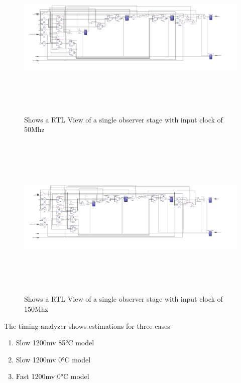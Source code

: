 \begin{figure}[]
\centering
\includegraphics[width=650px,height=300px,angle=-90]{../../pictures/22.02.2014/onlyObserver/OBS_50M.jpg}
\caption[RTL View of Observer 0 with clock 50Mhz]{Shows a RTL View of a single observer stage with input clock of 50Mhz}
\label{fig:test:only:50:obs0}
\end{figure}


\begin{figure}[]
\centering
\includegraphics[width=650px,height=300px,angle=-90]{../../pictures/22.02.2014/onlyObserver/OBS_150M.jpg}
\caption[RTL View of Observer 0 with clock 150Mhz]{Shows a RTL View of a single observer stage with input clock of 150Mhz}
\label{fig:test:only:50:obs0}
\end{figure}

\newpage
The timing analyzer shows estimations for three cases
\begin{enumerate}
\item Slow 1200mv 85°C model
\item Slow 1200mv 0°C model
\item Fast 1200mv 0°C model
\end{enumerate}

